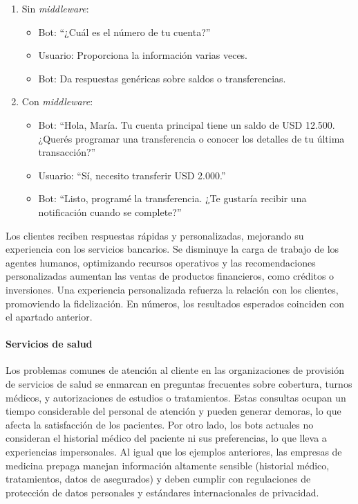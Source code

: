 \begin{enumerate}
    \item Sin \textit{middleware}:
    \begin{itemize}
        \item Bot: ``¿Cuál es el número de tu cuenta?''
        \item Usuario: Proporciona la información varias veces.
        \item Bot: Da respuestas genéricas sobre saldos o transferencias.
    \end{itemize}
    
    \item Con \textit{middleware}:
    \begin{itemize}
        \item Bot: ``Hola, María. Tu cuenta principal tiene un saldo de USD 12.500. ¿Querés programar una transferencia o conocer los detalles de tu última transacción?''
        \item Usuario: ``Sí, necesito transferir USD 2.000.''
        \item Bot: ``Listo, programé la transferencia. ¿Te gustaría recibir una notificación cuando se complete?''
    \end{itemize}
\end{enumerate}

Los clientes reciben respuestas rápidas y personalizadas, mejorando su experiencia con los servicios bancarios. Se disminuye la carga de trabajo de los agentes humanos, optimizando recursos operativos y las recomendaciones personalizadas aumentan las ventas de productos financieros, como créditos o inversiones. Una experiencia personalizada refuerza la relación con los clientes, promoviendo la fidelización. En números, los resultados esperados coinciden con el apartado anterior.

\paragraph{Servicios de salud}

Los problemas comunes de atención al cliente en las organizaciones de provisión de servicios de salud se enmarcan en preguntas frecuentes sobre cobertura, turnos médicos, y autorizaciones de estudios o tratamientos. Estas consultas ocupan un tiempo considerable del personal de atención y pueden generar demoras, lo que afecta la satisfacción de los pacientes. Por otro lado, los bots actuales no consideran el historial médico del paciente ni sus preferencias, lo que lleva a experiencias impersonales. Al igual que los ejemplos anteriores, las empresas de medicina prepaga manejan información altamente sensible (historial médico, tratamientos, datos de asegurados) y deben cumplir con regulaciones de protección de datos personales y estándares internacionales de privacidad.

